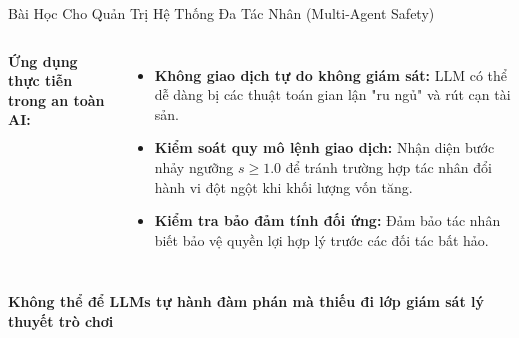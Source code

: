 \documentclass[aspectratio=169,9pt]{beamer}
\newcommand{\cmark}{\ding{51}}
\newcommand{\takeaway}[1]{%
  \par\vspace{\fill}%
  \noindent\begin{mdframed}[
    linecolor=maccent, linewidth=1.2pt,
    backgroundcolor=mlightgold,
    innertopmargin=3pt, innerbottommargin=3pt,
    innerleftmargin=8pt, innerrightmargin=8pt,
    roundcorner=3pt, skipabove=2pt, skipbelow=0pt
  ]
  \centering\footnotesize\bfseries\color{mprimary} #1
  \end{mdframed}\par%
}
\begin{document}
\begin{frame}{Bài Học Cho Quản Trị Hệ Thống Đa Tác Nhân (Multi-Agent Safety)}
\begin{columns}[c]
\textbf{Ứng dụng thực tiễn trong an toàn AI:}

\vspace{0.4em}
\begin{itemize}\small\setlength\itemsep{6pt}
  \item[\textcolor{mgood}{\textbf{\cmark}}] \textbf{Không giao dịch tự do không giám sát:} LLM có thể dễ dàng bị các thuật toán gian lận "ru ngủ" và rút cạn tài sản.
  \item[\textcolor{mgood}{\textbf{\cmark}}] \textbf{Kiểm soát quy mô lệnh giao dịch:} Nhận diện bước nhảy ngưỡng $s \ge 1.0$ để tránh trường hợp tác nhân đổi hành vi đột ngột khi khối lượng vốn tăng.
  \item[\textcolor{mgood}{\textbf{\cmark}}] \textbf{Kiểm tra bảo đảm tính đối ứng:} Đảm bảo tác nhân biết bảo vệ quyền lợi hợp lý trước các đối tác bất hảo.
\end{itemize}

\end{columns}

\takeaway{Không thể để LLMs tự hành đàm phán mà thiếu đi lớp giám sát lý thuyết trò chơi}
\end{frame}
\end{document}
